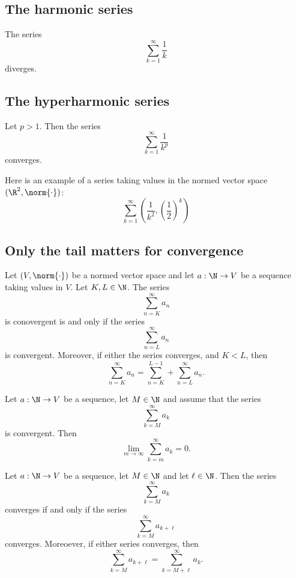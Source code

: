 \subsection{The harmonic series}
\begin{proposition}
    The series 
    $$\sum_{k=1}^\infty \frac{1}{k}$$
    diverges.
\end{proposition}

\subsection{The hyperharmonic series}
\begin{proposition}
    Let $p > 1$. Then the series 
    $$\sum_{k=1}^\infty \frac{1}{k^p}$$
    converges.
\end{proposition}

\begin{example}
    Here is an example of a series taking values in the normed vector space $(\R^2, \norm{\cdot})$:
    $$\sum_{k=1}^\infty \left(\frac{1}{k^2}, \left(\frac{1}{2}\right)^k\right)$$
\end{example}

\subsection{Only the tail matters for convergence}
\begin{lemma}
    Let $(V, \norm{\cdot})$ be a normed vector space and let $a: \N \to V$ be a sequence taking values in $V$. Let $K,L \in \N$. The series
    $$\sum_{n=K}^\infty a_n$$
    is conovergent is and only if the series
    $$\sum_{n=L}^\infty a_n$$
    is convergent. Moreover, if either the series converges, and $K < L$, then
$$\sum_{n=K}^\infty a_n = \sum_{n=K}^{L-1} + \sum_{n=L}^\infty a_n.$$
\end{lemma}

\begin{proposition}
    Let $a: \N \to V$ be a sequence, let $M \in \N$ and assume that the series
    $$\sum_{k=M}^\infty a_k$$
    is convergent. Then
    $$\lim_{m\to\infty} \sum_{k=m}^\infty a_k = 0.$$
\end{proposition}

\begin{proposition}
    Let $a: \N \to V$ be a sequence, let $M \in \N$ and let $\ell \in \N$. Then the series
    $$\sum_{k=M}^\infty a_k$$
    converges if and only if the series
    $$\sum_{k=M}^\infty a_{k+\ell}$$
    converges. Moreoever, if either series converges, then
    $$\sum_{k=M}^\infty a_{k+\ell} = \sum_{k=M+\ell}^\infty a_{k}.$$
\end{proposition}

